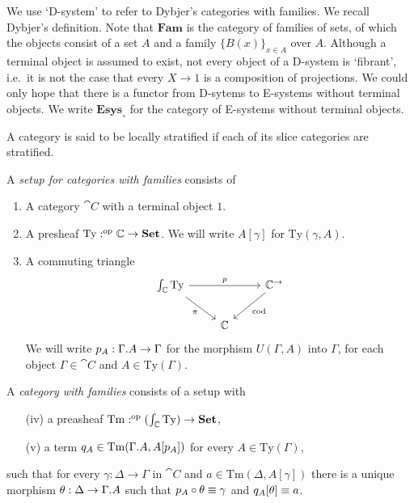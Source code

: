We use `D-system' to refer to Dybjer's categories with families. We recall
Dybjer's definition. Note that $\mathbf{Fam}$ is the category of families of
sets, of which the objects consist of a set $A$ and a family $\{B(x)\}_{x\in A}$
over $A$. Although a terminal object is assumed to exist, not every object 
of a D-system is `fibrant', i.e.~it is
not the case that every $X\to 1$ is a composition of projections.
We could only hope that there is a functor from D-sytems to E-systems without
terminal objects. We write $\mathbf{Esys}_{\circ}$ for the category of E-systems
without terminal objects.

\begin{defn}
A category is said to be locally stratified if each of its slice categories
are stratified.
\end{defn}

\begin{defn}
A \emph{setup for categories with families} consists of
\begin{enumerate}
\item A category $\cat{C}$ with a terminal object $1$.
\item A presheaf $\mathrm{Ty}:^{\mathrm{op}}{\mathbb{C}}\to\mathbf{Set}$. We will write
$A[\gamma]$ for $\mathrm{Ty}(\gamma,A)$. 
\item A commuting triangle
\begin{equation*}
\begin{tikzcd}
\int_\cat{C}\mathrm{Ty} \arrow[dr,swap,"\pi"] \arrow[rr,"p"] & & \cat{C}^{\to} \arrow[dl,"\mathrm{cod}"] \\
& \cat{C}
\end{tikzcd}
\end{equation*} 
We will write $p_A:\ctxext{\Gamma}{A}\to\Gamma$
for the morphism $U(\Gamma,A)$ into $\Gamma$, for each object $\Gamma\in\cat{C}$ and
$A\in\mathrm{Ty}(\Gamma)$.
\end{enumerate}
\end{defn}

\begin{defn}
A \emph{category with families} consists of a setup with
\begin{enumerate}
\item[(iv)] a preasheaf $\mathrm{Tm}:^{\mathrm{op}}{(\int_\mathbb{C}\mathrm{Ty})}\to\mathbf{Set}$,
\item[(v)] a term $q_A\in\mathrm{Tm}(\ctxext{\Gamma}{A},A[p_A])$ for every
$A\in\mathrm{Ty}(\Gamma)$, 
\end{enumerate}
such that for every $\gamma:\Delta\to\Gamma$ in $\cat{C}$ and 
$a\in \mathrm{Tm}(\Delta,A[\gamma])$ there is a unique morphism 
$\theta:\Delta\to \ctxext{\Gamma}{A}$ such that $p_A\circ\theta\equiv\gamma$ and 
$q_A[\theta]\equiv a$.
\end{defn}

